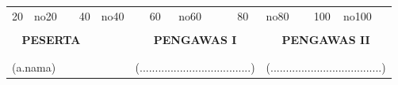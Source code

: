 \documentclass[12pt]{article}
\begin{document}
\begin{table}[]
\begin{tabular}{lllllllllllllll}
\multicolumn{1}{|l|}{20} & 
\multicolumn{1}{l|}{no20}        & 
\multicolumn{1}{l|}{} & 
\multicolumn{1}{l|}{40} & 
\multicolumn{1}{l|}{no40}        & 
\multicolumn{1}{l|}{} & 
\multicolumn{1}{l|}{60} & 
\multicolumn{1}{l|}{no60}        & 
\multicolumn{1}{l|}{} & 
\multicolumn{1}{l|}{80} & 
\multicolumn{1}{l|}{no80}        & 
\multicolumn{1}{l|}{} & 
\multicolumn{1}{l|}{100} & 
\multicolumn{1}{l|}{no100}        &  \\ \cline{1-2} \cline{4-5} \cline{7-8} \cline{10-11} \cline{13-14}
                         &                              &                       &                         &                              &                       &                         &                              &                       &                         &                              &                       &                          &                              &  \\

\multicolumn{4}{c}{\textbf{PESERTA}}                                                                      &                              & 
\multicolumn{5}{c}{\textbf{PENGAWAS I}}                                                                                          & 
\multicolumn{5}{c}{\textbf{PENGAWAS II}}                                                                          \\
                         &                              &                       &                         &                              &                       &                         &                              &                       &                         &                              &                       &                          &                              &  \\
                         &                              &                       &                         &                              &                       &                         &                              &                       &                         &                              &                       &                          &                              &  \\

\multicolumn{4}{l}{(a.nama)}                                                &                              & 
\multicolumn{5}{l}{(....................................)}                                                                       & 
\multicolumn{5}{c}{(....................................)}                                                       
\end{tabular}
\end{table}
\end{document}
